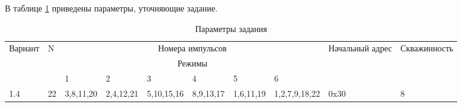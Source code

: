 В таблице \ref{table:task} приведены параметры, уточняющие задание.
\begin{table}[h]
  \centering
  \begin{tabular}{|l|l|l|l|l|l|l|l|p{2cm}|l|}
    \hline
    Вариант & N &  \multicolumn{6}{|c|}{Номера импульсов} & Начальный \newline адрес & Скважинность \\ \cline{3-8}
            & & \multicolumn{6}{|c|}{Режимы} & & \\ \cline{3-8}
            & & 1 & 2 & 3 & 4 & 5 & 6 & & \\ \hline 
    1.4 & 22 & 3,8,11,20 & 2,4,12,21 & 5,10,15,16 & 8,9,13,17 & 1,6,11,19 & 1,2,7,9,18,22 & 0x30 & 8 \\ \hline
  \end{tabular}
  \caption{Параметры задания}
  \label{table:task}
\end{table}